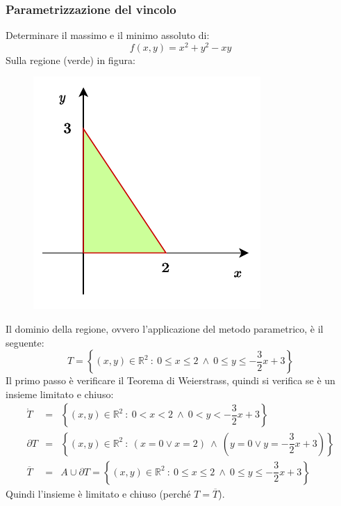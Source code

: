 \documentclass[a4paper]{article}
\begin{document}
	\subsubsection{Parametrizzazione del vincolo}\label{subsubsection: parametrizzazione del vincolo}

	Determinare il massimo e il minimo assoluto di:
	\begin{equation*}
		f\left(x,y\right) = x^{2} + y^{2} - xy
	\end{equation*}
	Sulla regione (verde) in figura:
	\begin{figure}[!htp]
		\centering
		\includegraphics[width=.4\textwidth]{img/parametrizzazione_del_vincolo.pdf}
	\end{figure}

	\noindent
	Il dominio della regione, ovvero l'applicazione del metodo parametrico, è il seguente:
	\begin{equation*}
		T = \left\{\left(x,y\right) \in \mathbb{R}^{2} \: : \: 0 \le x \le 2 \: \land \: 0 \le y \le -\dfrac{3}{2}x + 3\right\}
	\end{equation*}
	Il primo passo è verificare il Teorema di Weierstrass, quindi si verifica se è un insieme limitato e chiuso:
	\begin{equation*}
		\begin{array}{rcl}
			\mathring{T} &=& \left\{\left(x,y\right) \in \mathbb{R}^{2} \: : \: 0 < x < 2 \: \land \: 0 < y < -\dfrac{3}{2}x + 3\right\} \\ [1em]
			\partial T &=& \left\{\left(x,y\right) \in \mathbb{R}^{2} \: : \: \left(x = 0 \lor x = 2\right) \: \land \: \left(y=0 \lor y=-\dfrac{3}{2}x + 3\right)\right\} \\ [1em]
			\overline{T} &=& A \cup \partial T = \left\{\left(x,y\right) \in \mathbb{R}^{2} \: : \: 0 \le x \le 2 \: \land \: 0 \le y \le -\dfrac{3}{2}x + 3\right\}
		\end{array}
	\end{equation*}
	Quindi l'insieme è limitato e chiuso (perché $T = \overline{T}$).\newline
\end{document}
